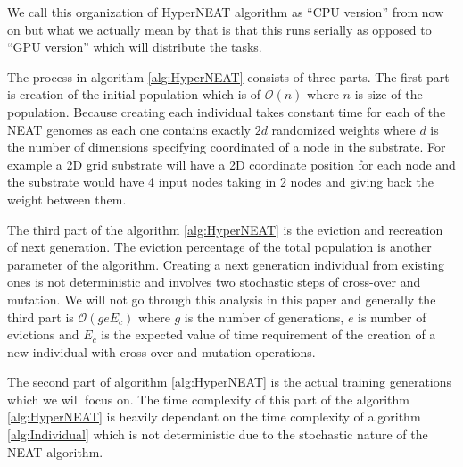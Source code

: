 \documentclass[twocolumn]{article}
\begin{document}
We call this organization of HyperNEAT algorithm as ``CPU version'' from now on but what we actually mean by that is that this runs serially as opposed to ``GPU version'' which will distribute the tasks.

The process in algorithm \ref{alg:HyperNEAT} consists of three parts. The first part is creation of the initial population which is of $\mathcal{O}(n)$ where $n$ is size of the population. Because creating each individual takes constant time for each of the NEAT genomes as each one contains exactly $2d$ randomized weights where $d$ is the number of dimensions specifying coordinated of a node in the substrate. For example a 2D grid substrate will have a 2D coordinate position for each node and the substrate would have 4 input nodes taking in 2 nodes and giving back the weight between them.

The third part of the algorithm \ref{alg:HyperNEAT} is the eviction and recreation of next generation. The eviction percentage of the total population is another parameter of the algorithm. Creating a next generation individual from existing ones is not deterministic and involves two stochastic steps of cross-over and mutation. We will not go through this analysis in this paper and generally the third part is $\mathcal{O}(geE_c)$ where $g$ is the number of generations, $e$ is number of evictions and $E_c$ is the expected value of time requirement of the creation of a new individual with cross-over and mutation operations.

The second part of algorithm \ref{alg:HyperNEAT} is the actual training generations which we will focus on. The time complexity of this part of the  algorithm \ref{alg:HyperNEAT} is heavily dependant on the time complexity of algorithm \ref{alg:Individual} which is not deterministic due to the stochastic nature of the NEAT algorithm.
\end{document}
